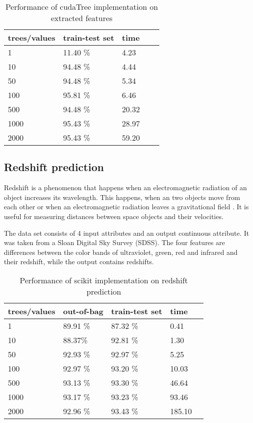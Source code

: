\documentclass[thesis=B,english]{FITthesis}[2012/10/20]
\begin{document}
\begin{table}[h]
\begin{tabular}{|l|l|l|l|l|}
\hline
trees/values & train-test set & time \\ \hline
1            & 11.40 \%              & 4.23      \\ \hline
10           & 94.48 \%              & 4.44      \\ \hline
50           & 94.48 \%              & 5.34      \\ \hline
100          & 95.81 \%              & 6.46      \\ \hline
500          & 94.48 \%              & 20.32     \\ \hline
1000         & 95.43 \%              & 28.97     \\ \hline
2000         & 95.43 \%              & 59.20     \\ \hline
\end{tabular}
\caption{Performance of cudaTree implementation on extracted features}
\label{tab:cuda-extracted}
\end{table}

\subsection{Redshift prediction}
Redshift is a phenomenon that happens when an electromagnetic radiation of an object increases its wavelength. This happens, when an two objects move from each other or when an electromagnetic radiation leaves a gravitational field \cite{}. It is useful for measuring distances between space objects and their velocities. 

The data set consists of 4 input attributes and an output continuous attribute. It was taken from a Sloan Digital Sky Survey (SDSS).  The four features are differences between the color bands of ultraviolet, green, red and infrared and their redshift, while the output contains redshifts.
\begin{table}[h]
\begin{tabular}{|l|l|l|l|l|}
\hline
trees/values & out-of-bag & train-test set & time \\ \hline
1            &89.91 \%                   &87.32 \%                & 0.41          \\ \hline
10           &88.37\%                    &92.81 \%                &1.30           \\ \hline
50           &92.93 \%                   &92.97 \%                &5.25        \\ \hline
100          &92.97 \%                   &93.20 \%                &10.03        \\ \hline
500          &93.13 \%                   &93.30 \%                &46.64      \\ \hline
1000         &93.17 \%                   &93.23 \%                &93.46         \\ \hline
2000         &92.96 \%                   &93.43 \%                &185.10        \\ \hline
\end{tabular}
\caption{Performance of scikit implementation on redshift prediction}
\label{tab:scikit-redshift}
\end{table}
\end{document}
